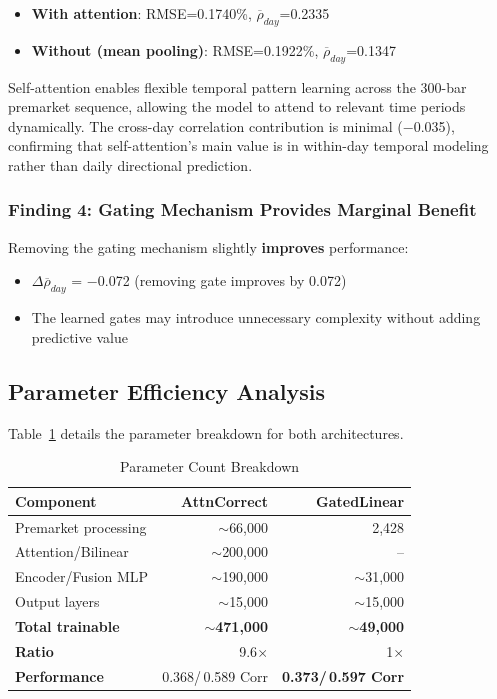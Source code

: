 \documentclass[10pt,conference]{IEEEtran}
\newcommand{\rev}[1]{#1}
\begin{document}
\begin{itemize}
    \item \textbf{With attention}: RMSE=\rev{0.1740}\%, \rev{$\overline{\rho}_{day}$}=\rev{0.2335}
    \item \textbf{Without (mean pooling)}: RMSE=\rev{0.1922}\%, \rev{$\overline{\rho}_{day}$}=\rev{0.1347}
\end{itemize}

Self-attention enables flexible temporal pattern learning across the 300-bar premarket sequence, allowing the model to attend to relevant time periods dynamically. \rev{The cross-day correlation contribution is minimal ($-$0.035), confirming that self-attention's main value is in within-day temporal modeling rather than daily directional prediction.}

\subsubsection{Finding 4: Gating Mechanism Provides Marginal Benefit}

Removing the gating mechanism slightly \textbf{improves} performance:
\begin{itemize}
    \item \rev{$\Delta\overline{\rho}_{day}$} = \rev{$-$0.072} (removing gate improves by \rev{0.072})
    \item The learned gates may introduce unnecessary complexity without adding predictive value
\end{itemize}

\subsection{Parameter Efficiency Analysis}

Table~\ref{tab:params} details the parameter breakdown for both architectures.

\begin{table}[t]
\centering
\caption{Parameter Count Breakdown}
\label{tab:params}
\begin{tabular}{lrr}
\toprule
\textbf{Component} & \textbf{AttnCorrect} & \textbf{GatedLinear} \\
\midrule
Premarket processing & ${\sim}$66,000 & 2,428 \\
Attention/Bilinear & ${\sim}$200,000 & -- \\
Encoder/Fusion MLP & ${\sim}$190,000 & ${\sim}$31,000 \\
Output layers & ${\sim}$15,000 & ${\sim}$15,000 \\
\midrule
\textbf{Total trainable} & \textbf{${\sim}$471,000} & \textbf{${\sim}$49,000} \\
\textbf{Ratio} & 9.6$\times$ & 1$\times$ \\
\midrule
\textbf{Performance} & \rev{0.368/$\,$0.589} Corr & \textbf{\rev{0.373/$\,$0.597} Corr} \\
\bottomrule
\end{tabular}
\end{table}
\end{document}
